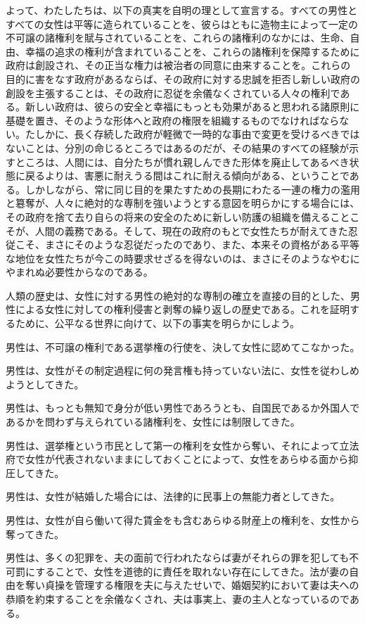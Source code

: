 よって、わたしたちは、以下の真実を自明の理として宣言する。すべての男性とすべての女性は平等に造られていることを、彼らはともに造物主によって一定の不可譲の諸権利を賦与されていることを、これらの諸権利のなかには、生命、自由、幸福の追求の権利が含まれていることを、これらの諸権利を保障するために政府は創設され、その正当な権力は被治者の同意に由来することを。これらの目的に害をなす政府があるならば、その政府に対する忠誠を拒否し新しい政府の創設を主張することは、その政府に忍従を余儀なくされている人々の権利である。新しい政府は、彼らの安全と幸福にもっとも効果があると思われる諸原則に基礎を置き、そのような形体へと政府の権限を組織するものでなければならない。たしかに、長く存続した政府が軽微で一時的な事由で変更を受けるべきではないことは、分別の命じるところではあるのだが、その結果のすべての経験が示すところは、人間には、自分たちが慣れ親しんできた形体を廃止してあるべき状態に戻るよりは、害悪に耐えうる間はこれに耐える傾向がある、ということである。しかしながら、常に同じ目的を果たすための長期にわたる一連の権力の濫用と簒奪が、人々に絶対的な専制を強いようとする意図を明らかにする場合には、その政府を捨て去り自らの将来の安全のために新しい防護の組織を備えることこそが、人間の義務である。そして、現在の政府のもとで女性たちが耐えてきた忍従こそ、まさにそのような忍従だったのであり、また、本来その資格がある平等な地位を女性たちが今この時要求せざるを得ないのは、まさにそのようなやむにやまれぬ必要性からなのである。

人類の歴史は、女性に対する男性の絶対的な専制の確立を直接の目的とした、男性による女性に対しての権利侵害と剥奪の繰り返しの歴史である。これを証明するために、公平なる世界に向けて、以下の事実を明らかにしよう。

男性は、不可譲の権利である選挙権の行使を、決して女性に認めてこなかった。

男性は、女性がその制定過程に何の発言権も持っていない法に、女性を従わしめようとしてきた。

男性は、もっとも無知で身分が低い男性であろうとも、自国民であるか外国人であるかを問わず与えられている諸権利を、女性には制限してきた。

男性は、選挙権という市民として第一の権利を女性から奪い、それによって立法府で女性が代表されないままにしておくことによって、女性をあらゆる面から抑圧してきた。

男性は、女性が結婚した場合には、法律的に民事上の無能力者としてきた。

男性は、女性が自ら働いて得た賃金をも含むあらゆる財産上の権利を、女性から奪ってきた。

男性は、多くの犯罪を、夫の面前で行われたならば妻がそれらの罪を犯しても不可罰にすることで、女性を道徳的に責任を取れない存在にしてきた。法が妻の自由を奪い貞操を管理する権限を夫に与えたせいで、婚姻契約において妻は夫への恭順を約束することを余儀なくされ、夫は事実上、妻の主人となっているのである。

